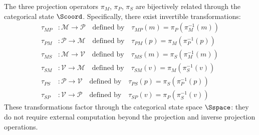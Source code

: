\begin{theorem}
\label{thm:identity_unification}
The three projection operators $\pi_M$, $\pi_P$, $\pi_S$ are bijectively related through the categorical state $\Scoord$. Specifically, there exist invertible transformations:
\begin{align}
\tau_{MP} &: \mathcal{M} \to \mathcal{P} \quad \text{defined by} \quad \tau_{MP}(m) = \pi_P(\pi_M^{-1}(m)) \label{eq:tau_MP} \\
\tau_{PM} &: \mathcal{P} \to \mathcal{M} \quad \text{defined by} \quad \tau_{PM}(p) = \pi_M(\pi_P^{-1}(p)) \label{eq:tau_PM} \\
\tau_{MS} &: \mathcal{M} \to \mathcal{V} \quad \text{defined by} \quad \tau_{MS}(m) = \pi_S(\pi_M^{-1}(m)) \label{eq:tau_MS} \\
\tau_{SM} &: \mathcal{V} \to \mathcal{M} \quad \text{defined by} \quad \tau_{SM}(v) = \pi_M(\pi_S^{-1}(v)) \label{eq:tau_SM} \\
\tau_{PS} &: \mathcal{P} \to \mathcal{V} \quad \text{defined by} \quad \tau_{PS}(p) = \pi_S(\pi_P^{-1}(p)) \label{eq:tau_PS} \\
\tau_{SP} &: \mathcal{V} \to \mathcal{P} \quad \text{defined by} \quad \tau_{SP}(v) = \pi_P(\pi_S^{-1}(v)) \label{eq:tau_SP}
\end{align}
These transformations factor through the categorical state space $\Sspace$: they do not require external computation beyond the projection and inverse projection operations.
\end{theorem}

